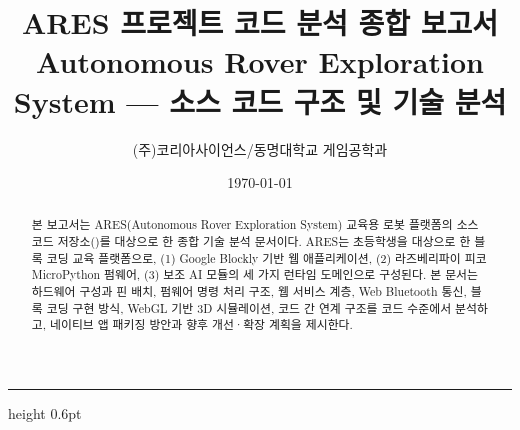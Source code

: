 \documentclass[11pt, oneside]{article}
\title{%
  {\sffamily\bfseries\fontsize{24}{28}\selectfont\color{deepblue}ARES 프로젝트 코드 분석 종합 보고서}\\[8pt]
  {\rmfamily\normalsize\color{accentcopper}Autonomous Rover Exploration System --- 소스 코드 구조 및 기술 분석}%
}
\author{\sffamily (주)코리아사이언스\quad/\quad 동명대학교 게임공학과}
\date{\today}
\begin{document}
\maketitle
\thispagestyle{plain}

\begin{abstract}
\noindent
본 보고서는 ARES(Autonomous Rover Exploration System) 교육용 로봇 플랫폼의
소스 코드 저장소(\href{https://github.com/dknife/ARES2}{})를
대상으로 한 종합 기술 분석 문서이다. ARES는 초등학생을 대상으로 한 블록 코딩
교육 플랫폼으로, (1) Google Blockly 기반 웹 애플리케이션, (2) 라즈베리파이 피코
MicroPython 펌웨어, (3) 보조 AI 모듈의 세 가지 런타임 도메인으로 구성된다.
본 문서는 하드웨어 구성과 핀 배치, 펌웨어 명령 처리 구조, 웹 서비스 계층,
Web Bluetooth 통신, 블록 코딩 구현 방식, WebGL 기반 3D 시뮬레이션, 코드 간
연계 구조를 코드 수준에서 분석하고, 네이티브 앱 패키징 방안과 향후 개선·확장
계획을 제시한다.
\end{abstract}

\vspace{0.5em}
{\color{rulegray}\hrule height 0.6pt}
\vspace{1.0em}

\tableofcontents
\newpage
















\appendix
\renewcommand{\thesection}{A\arabic{section}}
\renewcommand{\thesubsection}{\thesection.\arabic{subsection}}
\newpage



\end{document}
